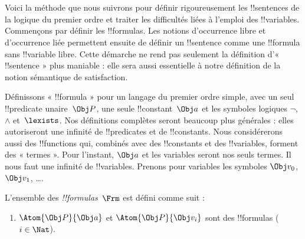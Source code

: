 \documentclass[../../../include/open-logic-section]{subfiles}
\begin{document}

\section{}

Voici la méthode que nous suivrons pour définir rigoureusement les
!!{sentence}s de la logique du premier ordre et traiter les difficultés
liées à l'emploi des !!{variable}s. Commençons par définir les
!!{formula}s. Les notions d'occurrence libre et d'occurrence liée
permettent ensuite de définir un !!{sentence} comme une
!!{formula} sans !!{variable} libre.
Cette démarche ne rend pas seulement la définition d'« !!{sentence} »
plus maniable : elle sera aussi essentielle à notre définition de la
notion sémantique de satisfaction.

Définissons « !!{formula} » pour un langage du premier ordre simple,
avec un seul !!{predicate} unaire~$\Obj P$, une seule
!!{constant}~$\Obj a$ et les symboles logiques $\lnot$, $\land$ et~$\lexists$. Nos
définitions complètes seront beaucoup plus générales : elles
autoriseront une infinité de !!{predicate}s et de !!{constant}s. Nous
considérerons aussi des !!{function}s qui, combinés avec des
!!{constant}s et des !!{variable}s, forment des « termes ». Pour
l'instant, $\Obj a$ et les variables seront nos seuls termes. Il nous
faut une infinité de !!{variable}s. Prenons pour variables les symboles $\Obj v_0$, $\Obj v_1$, \dots.

\begin{defn}
L'ensemble des \emph{!!{formula}s}~$\Frm$ est défini comme suit :
\begin{enumerate}
\item{} $\Atom{\Obj P}{\Obj a}$ et
  $\Atom{\Obj P}{\Obj v_i}$ sont des !!{formula}s ($i \in \Nat$).




\end{enumerate}
\end{defn}
\end{document}
